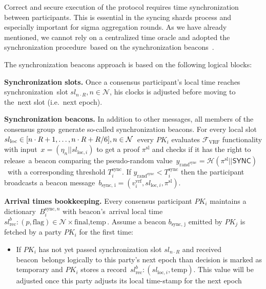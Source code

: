 Correct and secure execution of the protocol requires time synchronization between participants.
This is essential in the syncing shards process and especially important for sigma aggregation rounds.
As we have already mentioned, we cannot rely on a centralized time oracle and adopted the synchronization procedure\
based on the synchronization beacons~\cite{cryptoeprint:2019/838}.

The synchronization beacons approach is based on the following logical blocks:
\begin{legal}
    \item[]\textbf{Synchronization slots.} Once a consensus participant’s local time reaches synchronization\
    slot ${sl_{n \cdot R}, n \in \mathcal{N}}$, his clocks is adjusted before moving to the\
    next slot (i.e.\ next epoch).
    \item[]\textbf{Synchronization beacons.} In addition to other messages, all members of the consensus group\
    generate so-called synchronization beacons.
    For every local slot $sl_{\text{loc}} \in [n \cdot R + 1,\dots,n \cdot R + R \// 6], n \in \mathcal{N}$\
    every $PK_i$ evaluates $\mathcal{F}_{\text{VRF}}$ functionality with input\
    ${x = (\eta_n || sl_{\text{loc}, i})}$ to get a proof $\pi^{\text{sl}}$ and checks if it has the right to release\
    a beacon comparing the pseudo-random value\
    ${y_{\text{rand}^{\text{sync}}} = \mathcal{H}(\pi^{\text{sl}} || \textsf{SYNC})}$\
    with a corresponding threshold $T^{\text{sync}}_i$.
    If ${y_{\text{rand}^{\text{sync}}} < T^{\text{sync}}_i}$ then the participant broadcasts a beacon message\
    $b_{\text{sync, i}} = (v^{\text{vrf}}_i, sl_{\text{loc}, i}, \pi^{\text{sl}})$.
    \item[]\textbf{Arrival times bookkeeping.} Every consensus participant $PK_i$ maintains a dictionary\
    $B_i^{\text{sync}, n}$ with beacon's\
    arrival local time ${sl^b_{\text{rec}}: (p, \text{flag}) \in \mathcal{N} \times {\text{final}, \text{temp}}}$.
    Assume a beacon $b_{\text{sync, j}}$ emitted by $PK_j$ is fetched by a party $PK_i$ for the first time:
    \begin{itemize}
        \item If $PK_i$ has not yet passed synchronization slot $sl_{n \cdot R}$ and received beacon\
        belongs logically to this party’s next epoch than decision is marked as temporary and $PK_i$ stores a record\
        ${sl^b_{\text{rec}}: (sl_{\text{loc}, i}, \text{temp})}$.
        This value will be adjusted once this party adjusts its local time-stamp for the next epoch

\end{itemize}
\end{legal}
